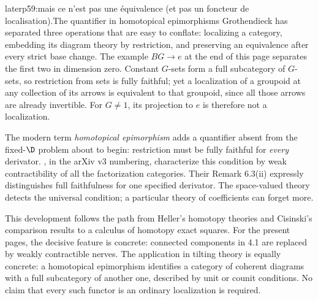 \begin{dcomment}{later}{p59:mais ce n'est pas une équivalence (et pas un foncteur de localisation).}{The quantifier in homotopical epimorphisms}
Grothendieck has separated three operations that are easy to conflate: localizing a category, embedding its diagram theory by restriction, and preserving an equivalence after every strict base change. The example $BG\to e$ at the end of this page separates the first two in dimension zero. Constant $G$-sets form a full subcategory of $G$-sets, so restriction from sets is fully faithful; yet a localization of a groupoid at any collection of its arrows is equivalent to that groupoid, since all those arrows are already invertible. For $G\ne1$, its projection to $e$ is therefore not a localization.

The modern term \emph{homotopical epimorphism} adds a quantifier absent from the fixed-$\D$ problem about to begin: restriction must be fully faithful for \emph{every} derivator. \citet[Definition 6.1 and Theorem 6.10]{GrothStovicek2016Trees}, in the arXiv v3 numbering, characterize this condition by weak contractibility of all the factorization categories. Their Remark 6.3(ii) expressly distinguishes full faithfulness for one specified derivator. The space-valued theory detects the universal condition; a particular theory of coefficients can forget more.

This development follows the path from Heller's homotopy theories and Cisinski's comparison results to a calculus of homotopy exact squares. For the present pages, the decisive feature is concrete: connected components in 4.1 are replaced by weakly contractible nerves. The application in tilting theory is equally concrete: a homotopical epimorphism identifies a category of coherent diagrams with a full subcategory of another one, described by unit or counit conditions. No claim that every such functor is an ordinary localization is required.
\end{dcomment}


